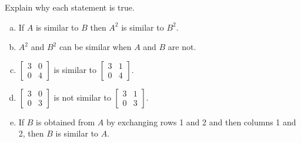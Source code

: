\begin{exercise}\label{exr:u32-true}
Explain why each statement is true.
\begin{enumerate}[(a)]
  \item If $A$ is similar to $B$ then $A^2$ is similar to $B^2$.
  \item $A^2$ and $B^2$ can be similar when $A$ and $B$ are not.
  \item $\left[\begin{smallmatrix}3&0\\0&4\end{smallmatrix}\right]$ is similar to
        $\left[\begin{smallmatrix}3&1\\0&4\end{smallmatrix}\right]$.
  \item $\left[\begin{smallmatrix}3&0\\0&3\end{smallmatrix}\right]$ is not similar to
        $\left[\begin{smallmatrix}3&1\\0&3\end{smallmatrix}\right]$.
  \item If $B$ is obtained from $A$ by exchanging rows 1 and 2 and then columns 1 and 2, then $B$
        is similar to $A$.
\end{enumerate}
\end{exercise}
